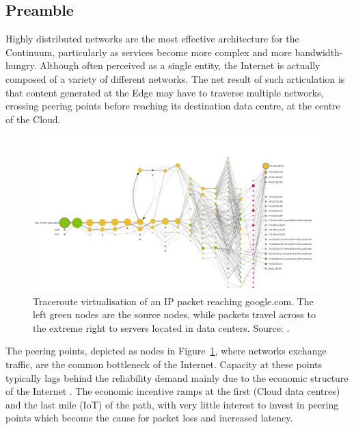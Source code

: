 \subsection{Preamble}
Highly distributed networks are the most effective architecture for the Continuum, particularly as services become more complex and more bandwidth-hungry. Although often perceived as a single entity, the Internet is actually composed of a variety of different networks. 
The net result of such articulation is that content generated at the Edge may have to traverse multiple networks, crossing peering points before reaching its destination data centre, at the centre of the Cloud.

\begin{figure}[ht]
\centering
\includegraphics[width=\columnwidth]{figures/traceroute}
\caption{Traceroute virtualisation of an IP packet reaching google.com. The left green nodes are the source nodes, while packets travel across to the extreme right to servers located in data centers. Source: \cite{traceroute-google}.}
\label{fig:traceroute}
\end{figure}

The peering points, depicted as nodes in Figure~\ref{fig:traceroute}, where networks exchange traffic, are the common bottleneck of the Internet. Capacity at these points typically lags behind the reliability demand mainly due to the economic structure of the Internet \cite{nygren2010akamai}. The economic incentive ramps at the first (Cloud data centres) and the last mile (IoT) of the path, with very little interest to invest in peering points which become the cause for packet loss and increased latency.


